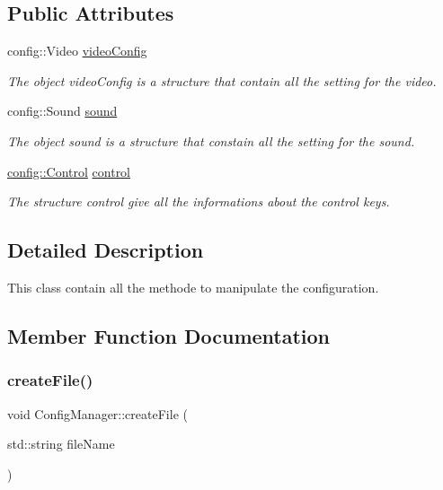 \subsection*{Public Attributes}
\begin{DoxyCompactItemize}
\item 
config\+::\+Video \hyperlink{classConfigManager_a1e0dbb8563b71871e6c68abce5620cd0}{video\+Config}
\begin{DoxyCompactList}\small\item\em The object video\+Config is a structure that contain all the setting for the video. \end{DoxyCompactList}\item 
config\+::\+Sound \hyperlink{classConfigManager_a010e2da02ebc90d7ce930d1c57a79e96}{sound}
\begin{DoxyCompactList}\small\item\em The object sound is a structure that constain all the setting for the sound. \end{DoxyCompactList}\item 
\mbox{\label{classConfigManager_abaade5dd62a670ad068376eb950e7168}} 
\hyperlink{structconfig_1_1Control}{config\+::\+Control} \hyperlink{classConfigManager_abaade5dd62a670ad068376eb950e7168}{control}
\begin{DoxyCompactList}\small\item\em The structure control give all the informations about the control keys. \end{DoxyCompactList}\end{DoxyCompactItemize}


\subsection{Detailed Description}
This class contain all the methode to manipulate the configuration. 

\subsection{Member Function Documentation}
\mbox{\label{classConfigManager_af78f80706b5a300a738c3fde04c9c91b}} 
\subsubsection{\texorpdfstring{create\+File()}{createFile()}}
{\footnotesize\ttfamily void Config\+Manager\+::create\+File (\begin{DoxyParamCaption}\item[{std\+::string}]{file\+Name }\end{DoxyParamCaption})}



